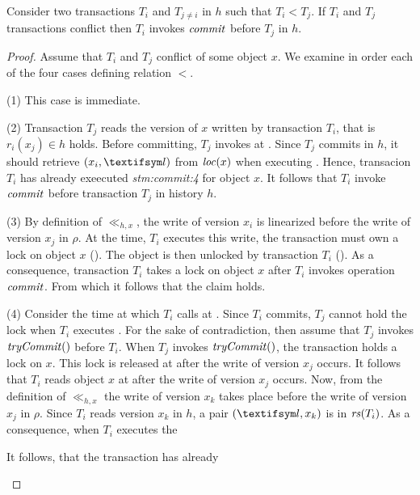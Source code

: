 \begin{proposition}
  Consider two transactions $T_i$ and $T_{j \neq i}$ in $h$ such that $T_i < T_j$.
  If $T_i$ and $T_j$ transactions conflict then $T_i$ invokes $\stmCommitFunction$ before $T_j$ in $h$.
\end{proposition}

\begin{proof}
  Assume that $T_i$ and $T_j$ conflict of some object $x$.
  We examine in order each of the four cases defining relation $<$.
  \begin{compactitem}
  \item[(1)]
    This case is immediate.
  \item[(2)]
    Transaction $T_j$ reads the version of $x$ written by transaction $T_i$, that is $r_i(x_j) \in h$ holds.
    Before committing, $T_j$ invokes \stmExtendFunction at .
    Since $T_j$ commits in $h$, it should retrieve $(x_i,\msgAny)$ from $\locationOf{x}$ when executing .
    Hence, transacion $T_i$ has already exeecuted \emph{stm:commit:4} for object $x$.
    It follows that $T_i$ invoke $\stmCommitFunction$ before transaction $T_j$ in history $h$.
  \item[(3)]
    By definition of $\ll_{h,x}$, the write of version $x_i$ is linearized before the write of version $x_j$ in $\rho$.
    At the time, $T_i$ executes this write, the transaction must own a lock on object $x$ ().
    The object is then unlocked by transaction $T_i$ ().
    As a consequence, transaction $T_i$ takes a lock on object $x$ after $T_i$ invokes operation $\stmCommitFunction$.
    From which it follows that the claim holds.
  \item[(4)]
    Consider the time at which $T_i$ calls \stmExtendFunction at .
    Since $T_i$ commits, $T_j$ cannot hold the lock when $T_i$ executes .
    For the sake of contradiction, then assume that $T_j$ invokes $\stmTryCommit$ before $T_i$.
    When $T_j$ invokes $\stmTryCommit$, the transaction holds a lock on $x$.
    This lock is released at  after the write of version $x_j$ occurs.    
    It follows that $T_i $ reads object $x$ at  after the write of version $x_j$ occurs.
    Now, from the definition of $\ll_{h,x}$ the write of version $x_k$ takes place before the write of version $x_j$ in $\rho$.
    Since $T_i$ reads version $x_k$ in $h$, a pair $(\msgAny,x_k)$ is in $\readSetOf{T_i}$.    
    As a consequence, when $T_i$ executes  the 
    
    
    
    It follows, that the transaction has already 
    
  \end{compactitem}
  
\end{proof}

